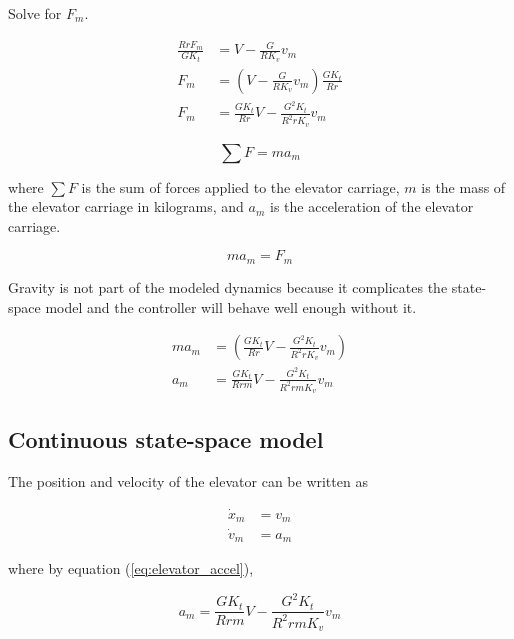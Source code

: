 Solve for $F_m$.

\begin{align}
  \frac{RrF_m}{GK_t} &= V - \frac{G}{RK_v} v_m \nonumber \\
  F_m &= \left(V - \frac{G}{RK_v} v_m\right) \frac{GK_t}{Rr} \nonumber \\
  F_m &= \frac{GK_t}{Rr} V - \frac{G^2K_t}{R^2 rK_v} v_m \label{eq:elevator_F_m}
\end{align}

\begin{equation}
  \sum F = ma_m \label{eq:elevator_F_ma}
\end{equation}

where $\sum F$ is the sum of forces applied to the elevator carriage, $m$ is the
mass of the elevator carriage in kilograms, and $a_m$ is the acceleration of the
elevator carriage.

\begin{equation*}
  ma_m = F_m
\end{equation*}

\begin{remark}
  Gravity is not part of the modeled dynamics because it complicates the
  state-space \gls{model} and the controller will behave well enough without it.
\end{remark}

\begin{align}
  ma_m &= \left(\frac{GK_t}{Rr} V - \frac{G^2K_t}{R^2 rK_v} v_m\right)
    \nonumber \\
  a_m &= \frac{GK_t}{Rrm} V - \frac{G^2K_t}{R^2 rmK_v} v_m
    \label{eq:elevator_accel}
\end{align}

\subsection{Continuous state-space model}

The position and velocity of the elevator can be written as

\begin{align}
  \dot{x}_m &= v_m \label{eq:elevator_cont_ss_pos} \\
  \dot{v}_m &= a_m \label{eq:elevator_cont_ss_vel}
\end{align}

where by equation (\ref{eq:elevator_accel}),

\begin{equation*}
  a_m = \frac{GK_t}{Rrm} V - \frac{G^2 K_t}{R^2 rm K_v} v_m
\end{equation*}


